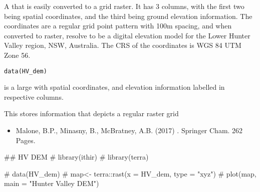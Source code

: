 \documentclass[a4paper]{book}
\begin{document}
%
\begin{Description}
A  that is easily converted to a grid raster. It has 3 columns, with the first two being spatial coordinates, and the third being ground elevation information. The coordinates are a regular grid point pattern with 100m spacing, and when converted to raster, resolve to be a digital elevation model for the Lower Hunter Valley region, NSW, Australia. The CRS of the coordinates is WGS 84 UTM Zone 56. 
\end{Description}
%
\begin{Usage}
\begin{verbatim}
data(HV_dem)
\end{verbatim}
\end{Usage}
%
\begin{Format}
 is a large  with spatial coordinates, and elevation information labelled in respective columns. 
\end{Format}
%
\begin{Details}
This  stores information that depicts a regular raster grid
\end{Details}
%
\begin{References}
\begin{itemize}

\item{} Malone, B.P., Minasny, B., McBratney, A.B. (2017) . Springer Cham. 262 Pages.

\end{itemize}

\end{References}
%
\begin{Examples}
\begin{ExampleCode}

## HV DEM
# library(ithir)
# library(terra)
 
# data(HV_dem)
# map<- terra::rast(x = HV_dem, type = "xyz")
# plot(map, main = "Hunter Valley DEM") 

\end{ExampleCode}
\end{Examples}
\end{document}
